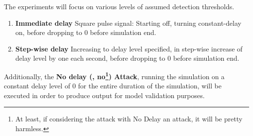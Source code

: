 




The experiments will focus on various levels of assumed detection thresholds.


\begin{enumerate}
    \item \textbf{Immediate delay} Square pulse signal: Starting off, turning constant-delay on,  before dropping to 0 before simulation end. 
    \item \textbf{Step-wise delay} Increasing to delay level specified, in step-wise increase of delay level by one each second, before dropping to 0 before simulation end. 
\end{enumerate}

Additionally, the  \textbf{No delay (, no\footnote{At least, if considering the attack with No Delay an attack, it will be pretty harmless. }) Attack}, running the simulation on a constant delay level of $0$ for the entire duration of the simulation, will be executed in order to produce output for model validation purposes. 












